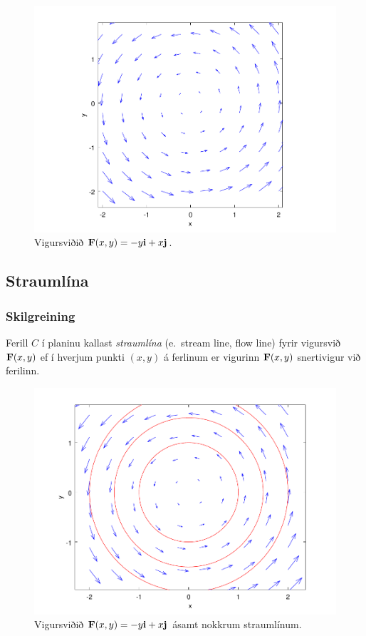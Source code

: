  \begin {figure}[h!]
 \centering
            \includegraphics[width=0.75\linewidth]{vfield}
            \caption*{ Vigursviðið $\mathbf{F}(x,y) = -y\mbox{${\bf i}$} + x \mbox{${\bf j}$}$.}
\end {figure}






\subsection{Straumlína} 

\subsubsection{Skilgreining }
 Ferill $C$ í planinu kallast {\em straumlína}
(e.~stream line, flow line)
fyrir vigursvið $\mbox{${\bf F}$}(x,y)$ ef í hverjum punkti $(x,y)$ á ferlinum er
vigurinn $\mbox{${\bf F}$}(x,y)$ snertivigur við ferilinn. 


 \begin {figure}[h!]
 \centering
            \includegraphics[width=0.55\linewidth]{flowlines}
            \caption*{ Vigursviðið $\mathbf{F}(x,y) = -y\mbox{${\bf i}$} + x \mbox{${\bf j}$}$ ásamt nokkrum straumlínum.}
\end {figure}





